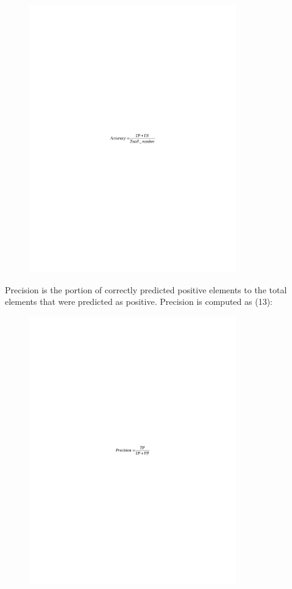 \begin{figure}[H]
	\centering
	\includegraphics[width=0.8\textwidth]{media/ict/image81}
	\caption*{}
\end{figure}


Precision is the portion of correctly predicted positive elements to the
total elements that were predicted as positive. Precision is computed as
(13):

\begin{figure}[H]
	\centering
	\includegraphics[width=0.8\textwidth]{media/ict/image82}
	\caption*{}
\end{figure}


